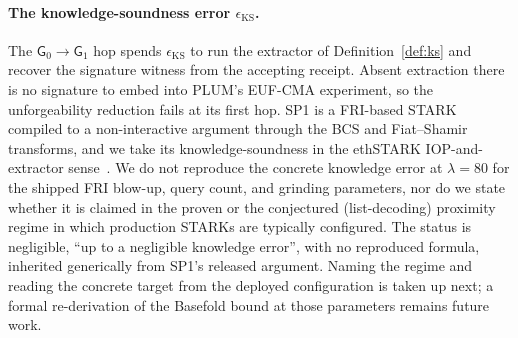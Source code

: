 \paragraph{The knowledge-soundness error $\epsilon_{\mathrm{KS}}$.}
The $\mathsf G_0\to\mathsf G_1$ hop spends $\epsilon_{\mathrm{KS}}$ to run the extractor of Definition~\ref{def:ks} and recover the signature witness from the accepting receipt. Absent extraction there is no signature to embed into PLUM's EUF-CMA experiment, so the unforgeability reduction fails at its first hop. SP1 is a FRI-based STARK compiled to a non-interactive argument through the BCS and Fiat--Shamir transforms, and we take its knowledge-soundness in the ethSTARK IOP-and-extractor sense~\cite{ethstark,bensasson2016iop}. We do not reproduce the concrete knowledge error at $\lambda=80$ for the shipped FRI blow-up, query count, and grinding parameters, nor do we state whether it is claimed in the proven or the conjectured (list-decoding) proximity regime in which production STARKs are typically configured. The status is negligible, ``up to a negligible knowledge error'', with no reproduced formula, inherited generically from SP1's released argument. Naming the regime and reading the concrete target from the deployed configuration is taken up next; a formal re-derivation of the Basefold bound at those parameters remains future work.

